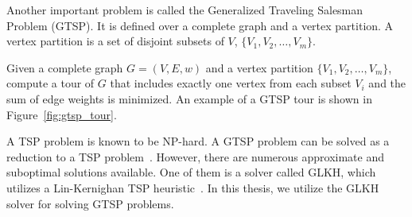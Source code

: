 \documentclass[../main.tex]{subfiles}
\begin{document}
Another important problem is called the Generalized Traveling Salesman Problem (GTSP). It is defined over a complete graph and a vertex partition. A vertex partition is a set of disjoint subsets of $V$, $\{V_1,V_2,
\ldots,V_m\}$.
\begin{problem}[GTSP]
Given a complete graph $G=(V,E,w)$ and a vertex partition $\{V_1,V_2,\ldots,V_m\}$, compute a tour of $G$ that includes exactly one vertex from each subset $V_i$ and the sum of edge weights is minimized. An example of a GTSP tour is shown in Figure~\ref{fig:gtsp_tour}.
\end{problem}

A TSP problem is known to be NP-hard. A GTSP problem can be solved as a reduction to a TSP problem~\cite{noon1993efficient}. However, there are numerous approximate and suboptimal solutions available. One of them is a solver called GLKH, which utilizes a Lin-Kernighan TSP heuristic~\cite{helsgaun2009general}. In this thesis, we utilize the GLKH solver for solving GTSP problems.



\end{document}
